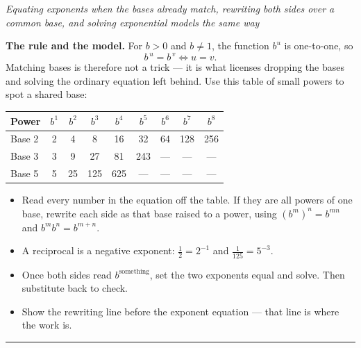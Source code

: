 \documentclass[12pt]{article}
\begin{document}

\begin{center}\small\textit{Equating exponents when the bases already match,
rewriting both sides over a common base, and solving exponential models the same
way}\end{center}

\noindent\textbf{The rule and the model.} For $b > 0$ and $b \neq 1$, the function
$b^u$ is one-to-one, so
\[ b^{\,u} = b^{\,v} \iff u = v. \]
Matching bases is therefore not a trick --- it is what licenses dropping the bases
and solving the ordinary equation left behind. Use this table of small powers to
spot a shared base:

\begin{center}\small
\begin{tabular}{|l|c|c|c|c|c|c|c|c|}\hline
\textbf{Power} & $b^{1}$ & $b^{2}$ & $b^{3}$ & $b^{4}$ & $b^{5}$ & $b^{6}$ & $b^{7}$ & $b^{8}$\\\hline
Base 2 & 2 & 4 & 8 & 16 & 32 & 64 & 128 & 256\\\hline
Base 3 & 3 & 9 & 27 & 81 & 243 & --- & --- & ---\\\hline
Base 5 & 5 & 25 & 125 & 625 & --- & --- & --- & ---\\\hline
\end{tabular}
\end{center}

\begin{itemize}[leftmargin=0.9cm, itemsep=1pt, topsep=3pt]
  \item Read every number in the equation off the table. If they are all powers of
        one base, rewrite each side as that base raised to a power, using
        $(b^{m})^{n} = b^{mn}$ and $b^{m}b^{n} = b^{m+n}$.
  \item A reciprocal is a negative exponent: $\tfrac{1}{2} = 2^{-1}$ and
        $\tfrac{1}{125} = 5^{-3}$.
  \item Once both sides read $b^{\text{something}}$, set the two exponents equal
        and solve. Then substitute back to check.
  \item Show the rewriting line before the exponent equation --- that line is
        where the work is.
\end{itemize}
\vspace{0.1cm}
\noindent\rule{\linewidth}{0.4pt}

\end{document}
